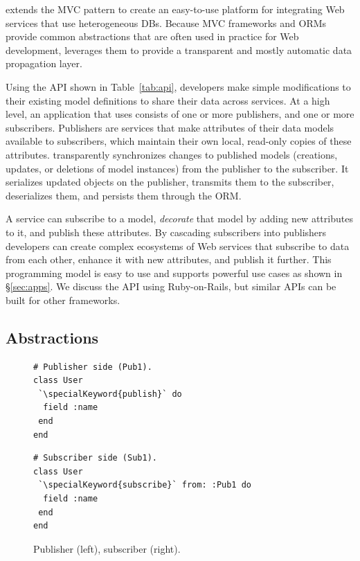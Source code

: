 \synapse extends the MVC pattern to create an
easy-to-use platform for integrating Web services that use
heterogeneous DBs.  
Because MVC frameworks and ORMs provide common abstractions that are
often used in practice for Web development, \synapse
leverages them to provide a transparent and mostly automatic data
propagation layer.

Using the \synapse API shown in Table~\ref{tab:api}, developers make
simple modifications to their existing model definitions to share their data
across services. At a high
level, an application that uses \synapse consists of one or more publishers,
and one or more subscribers. Publishers are services that make attributes of
their data models available to subscribers, which maintain their own local,
read-only copies of these attributes. \synapse transparently
synchronizes changes to published models (creations, updates, or deletions of
model instances) from the publisher to the subscriber.  It serializes
updated objects on the publisher, transmits them to the subscriber, deserializes
them, and persists them through the ORM.

A service can
subscribe to a model, \emph{decorate} that model by adding new
attributes to it, and publish these attributes. By cascading
subscribers into publishers developers can create complex
ecosystems of Web services that subscribe to data from each other, enhance it
with new attributes, and publish it further.  This
programming model is easy to use and supports powerful use
cases as shown in \S\ref{sec:apps}.
We discuss the \synapse API using Ruby-on-Rails, but similar APIs can be
built for other frameworks.


\subsection{\synapse Abstractions}
\label{sec:api}

\begin{figure}
\centering
\begin{minipage}{.8\textwidth}
\begin{minipage}{.4\textwidth}
\begin{lstlisting}[framexleftmargin=5pt]
# Publisher side (Pub1).
class User
 `\specialKeyword{publish}` do
  field :name
 end
end
\end{lstlisting}
\end{minipage}
\hspace{1.2in}
\begin{minipage}{.4\textwidth}
\begin{lstlisting}[framexleftmargin=5pt]
# Subscriber side (Sub1).
class User
 `\specialKeyword{subscribe}` from: :Pub1 do
  field :name
 end
end
\end{lstlisting}
\end{minipage}
\end{minipage}
\caption{{Publisher (left), subscriber (right).}}
\label{fig:pub-sub}
\end{figure}


